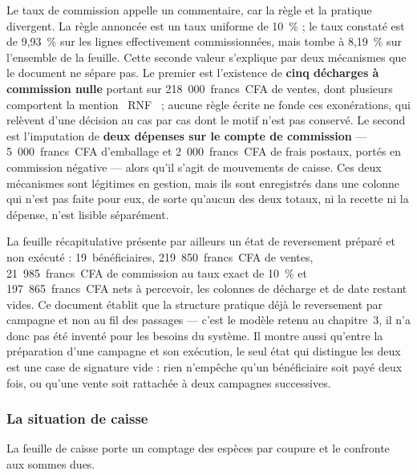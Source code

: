 Le taux de commission appelle un commentaire, car la règle et la pratique divergent. La règle annoncée est un taux uniforme de 10~\% ; le taux constaté est de 9,93~\% sur les lignes effectivement commissionnées, mais tombe à 8,19~\% sur l'ensemble de la feuille. Cette seconde valeur s'explique par deux mécanismes que le document ne sépare pas. Le premier est l'existence de \textbf{cinq décharges à commission nulle} portant sur 218~000~francs~CFA de ventes, dont plusieurs comportent la mention \guillemotleft~RNF~\guillemotright{} ; aucune règle écrite ne fonde ces exonérations, qui relèvent d'une décision au cas par cas dont le motif n'est pas conservé. Le second est l'imputation de \textbf{deux dépenses sur le compte de commission} --- 5~000~francs~CFA d'emballage et 2~000~francs~CFA de frais postaux, portés en commission négative --- alors qu'il s'agit de mouvements de caisse. Ces deux mécanismes sont légitimes en gestion, mais ils sont enregistrés dans une colonne qui n'est pas faite pour eux, de sorte qu'aucun des deux totaux, ni la recette ni la dépense, n'est lisible séparément.

La feuille récapitulative présente par ailleurs un état de reversement préparé et non exécuté : 19~bénéficiaires, 219~850~francs~CFA de ventes, 21~985~francs~CFA de commission au taux exact de 10~\% et 197~865~francs~CFA nets à percevoir, les colonnes de décharge et de date restant vides. Ce document établit que la structure pratique déjà le reversement par campagne et non au fil des passages --- c'est le modèle retenu au chapitre~3, il n'a donc pas été inventé pour les besoins du système. Il montre aussi qu'entre la préparation d'une campagne et son exécution, le seul état qui distingue les deux est une case de signature vide : rien n'empêche qu'un bénéficiaire soit payé deux fois, ou qu'une vente soit rattachée à deux campagnes successives.

\subsubsection{La situation de caisse}

La feuille de caisse porte un comptage des espèces par coupure et le confronte aux sommes dues.

